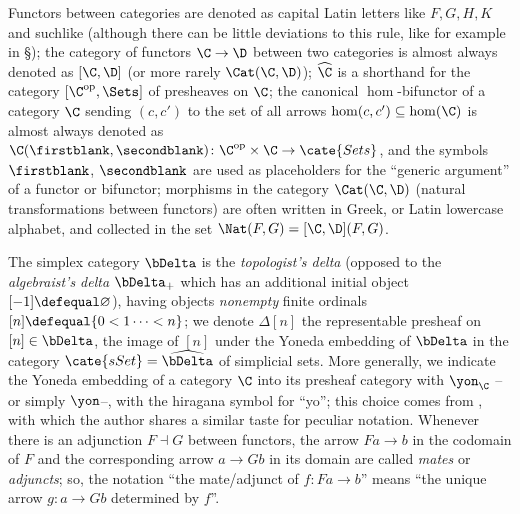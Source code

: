 Functors between categories are denoted as capital Latin letters like $F,G,H,K$ and suchlike (although there can be little deviations to this rule, like for example in \S{}); the category of functors $\C\to \D$ between two categories is almost always denoted as $[\C,\D]$ (or more rarely $\Cat(\C,\D)$); $\widehat{\C}$ is a shorthand for the category $[\C^\text{op},\Sets]$ of presheaves on $\C$; the canonical $\hom$\hyp{}bifunctor of a category $\C$ sending $(c,c')$ to the set of all arrows $\hom(c,c')\subseteq\hom(\C)$ is almost always denoted as $\C(\firstblank,\secondblank)\colon \C^\text{op}\times\C\to\cate{Sets}$, and the symbols $\firstblank$, $\secondblank$ are used as placeholders for the ``generic argument'' of a functor or bifunctor; morphisms in the category $\Cat(\C,\D)$ (\ie natural transformations between functors) are often written in Greek, or Latin lowercase alphabet, and collected in the set $\Nat(F,G) = [\C,\D](F,G)$. 

The simplex category $\bDelta$ is the \emph{topologist's delta} (opposed to the \emph{algebraist's delta} $\bDelta_+$ which has an additional initial object $[-1]\defequal \varnothing$), having objects \emph{nonempty} finite ordinals $[n]\defequal\{0<1\dots<n\}$; we denote $\Delta[n]$ the representable presheaf on $[n]\in\bDelta$, \ie the image of $[n]$ under the Yoneda embedding of $\bDelta$ in the category $\cate{sSet} = \widehat{\bDelta}$ of simplicial sets. More generally, we indicate the Yoneda embedding of a category $\C$ into its presheaf category with $\yon_\C$ --or simply $\yon$--, \ie with the hiragana symbol for ``yo''; this choice comes from \cite{Libland2015}, with which the author shares a similar taste for peculiar notation. Whenever there is an adjunction $F\dashv G$ between functors, the arrow $Fa\to b$ in the codomain of $F$ and the corresponding arrow $a\to Gb$ in its domain are called \emph{mates} or \emph{adjuncts}; so, the notation ``the mate/adjunct of $f\colon Fa\to b$'' means ``the unique arrow $g\colon a\to Gb$ determined by $f$''. 

